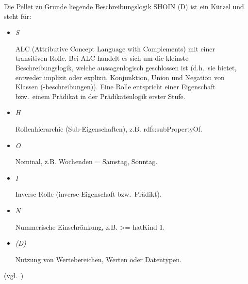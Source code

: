 Die Pellet zu Grunde liegende Beschreibungslogik SHOIN (D) ist ein Kürzel und steht für:
\begin{itemize}
\item \textit{S}

ALC (Attributive Concept Language with Complements) mit einer transitiven Rolle. Bei ALC handelt es sich um die kleinste Beschreibungslogik, welche aussagenlogisch geschlossen ist (d.h.\ sie bietet, entweder implizit oder explizit, Konjunktion, Union und Negation von Klassen (-beschreibungen)). Eine Rolle entspricht einer Eigenschaft bzw.\ einem Prädikat in der Prädikatenlogik erster Stufe.

\item \textit{H}

    Rollenhierarchie (Sub-Eigenschaften), z.B. rdfs:subPropertyOf.

\item \textit{O}

    Nominal, z.B. Wochenden = {Samstag, Sonntag}.


\item \textit{I}

    Inverse Rolle (inverse Eigenschaft bzw.\ Prädikt).

\item \textit{N}

    Nummerische Einschränkung, z.B. >= hatKind 1.

\item \textit{(D)}

    Nutzung von Wertebereichen, Werten oder Datentypen.
\end{itemize}

(vgl.~\cite{dl:baader2003})

